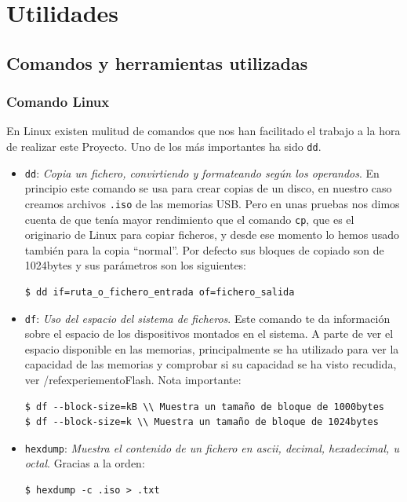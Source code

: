 \section{Utilidades}

\subsection{Comandos y herramientas utilizadas}
\subsubsection{Comando Linux}
En Linux existen mulitud de comandos que nos han facilitado el trabajo a la hora de realizar este Proyecto. Uno de los más importantes ha sido \verb|dd|.
\begin{itemize}
\item \verb|dd|: \textit{Copia un fichero, convirtiendo y formateando según los operandos}.
En principio este comando se usa para crear copias de un disco, en nuestro caso creamos archivos \verb|.iso| de las memorias USB. Pero en unas pruebas nos dimos cuenta de que tenía mayor rendimiento que el comando \verb|cp|, que es el originario de Linux para copiar ficheros, y desde ese momento lo hemos usado también para la copia ``normal''. Por defecto sus bloques de copiado son de 1024bytes y sus parámetros son los siguientes:
\begin{verbatim}
$ dd if=ruta_o_fichero_entrada of=fichero_salida
\end{verbatim}
\item \verb|df|: \textit{Uso del espacio del sistema de ficheros}.
Este comando te da información sobre el espacio de los dispositivos montados en el sistema. A parte de ver el espacio disponible en las memorias, principalmente se ha utilizado para ver la capacidad de las memorias y comprobar si su capacidad se ha visto recudida, ver /ref{experiementoFlash}. Nota importante:
\begin{verbatim}
$ df --block-size=kB \\ Muestra un tamaño de bloque de 1000bytes
$ df --block-size=k \\ Muestra un tamaño de bloque de 1024bytes
\end{verbatim}
\item \verb|hexdump|: \textit{Muestra el contenido de un fichero en ascii, decimal, hexadecimal, u octal}.
Gracias a la orden:
\begin{verbatim}
$ hexdump -c .iso > .txt
\end{verbatim}

\end{itemize}

